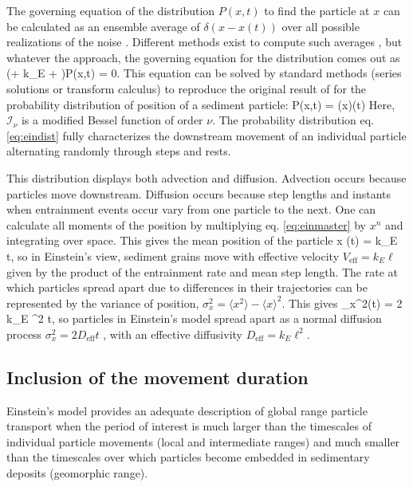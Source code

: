 The governing equation of the distribution $P(x,t)$ to find the particle at $x$ can be calculated as an ensemble average of $\delta(x-x(t))$ over all possible realizations of the noise \citep{Risken1989,Moss1989}. Different methods exist to compute such averages \citep{Hanggi1978, Hanggi1984a, Balakrishnan1993, VanDenBroeck1983}, but whatever the approach, the governing equation for the distribution comes out as
\be  \big(\ell \px \pt + k_E \ell \px + \pt \big)P(x,t) = 0. \label{eq:einmaster}\ee
This equation can be solved by standard methods (series solutions or transform calculus) \citep{Arfken1985,Prudnikov1992a} to reproduce the original result of \citet{Einstein1937} for the probability distribution of position of a sediment particle:
\be P(x,t) = \theta(x)\theta(t) \label{eq:eindist} \ee
Here, $\mathcal{I}_\nu$ is a modified Bessel function of order $\nu$. 
The probability distribution eq. \ref{eq:eindist} fully characterizes the downstream movement of an individual particle alternating randomly through steps and rests.

This distribution displays both advection and diffusion. Advection occurs because particles move downstream. Diffusion occurs because step lengths and instants when entrainment events occur vary from one particle to the next.
One can calculate all moments of the position by multiplying eq. \ref{eq:einmaster} by $x^n$ and integrating over space. This gives the mean position of the particle
\be \langle x \rangle (t) = k_E \ell t, \ee
so in Einstein's view, sediment grains move with effective velocity $V_\text{eff} = k_E \ell$ given by the product of the entrainment rate and mean step length.
The rate at which particles spread apart due to differences in their trajectories can be represented by the variance of position, $\sigma_x^2  = \langle x^2 \rangle - \langle x \rangle^2$. This gives
\be \sigma_x^2(t) = 2 k_E \ell^2 t, \ee
so particles in Einstein's model spread apart as a normal diffusion process $\sigma_x^2 = 2 D_\text{eff} t$ \citep{Sokolov2012}, with an effective diffusivity $D_\text{eff} = k_E \ell^2.$

\subsection{Inclusion of the movement duration}
\label{sec:lisle}

Einstein's model provides an adequate description of global range particle transport when the period of interest is much larger than the timescales of individual particle movements (local and intermediate ranges) and much smaller than the timescales over which particles become embedded in sedimentary deposits (geomorphic range).

